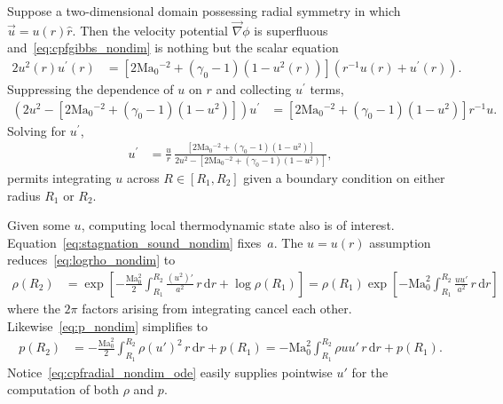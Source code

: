 \documentclass[letterpaper,11pt,nointlimits,reqno]{amsart}
\newcommand{\Mach}[1][]{\mbox{Ma}_{#1}}
\begin{document}
Suppose a two-dimensional domain possessing radial symmetry in which
$\vec{u}={u}\!\left(r\right)\hat{r}$.  Then the velocity potential
$\vec{\nabla}\phi$ is superfluous and~\eqref{eq:cpfgibbs_nondim} is nothing but
the scalar equation
\begin{align}
       2 u^2\!\left(r\right) u^\prime\!\left(r\right)
    &=
       \left[
          2 \Mach[0]{}^{-2}
        + \left(\gamma_0-1\right) \left(1 - u^2\!\left(r\right)\right)
       \right]
       \left(
          r^{-1} u\!\left(r\right) + u^\prime\!\left(r\right)
       \right)
.
\end{align}
Suppressing the dependence of $u$ on $r$ and collecting $u^\prime$ terms,
\begin{align}
       \left(
           2 u^2
         - \left[
              2 \Mach[0]{}^{-2} + \left(\gamma_0-1\right) \left(1 - u^2\right)
           \right]
       \right)
       u^\prime
    &=
       \left[
          2 \Mach[0]{}^{-2} + \left(\gamma_0-1\right) \left(1 - u^2\right)
       \right]
       r^{-1} u
.
\end{align}
Solving for $u^\prime$,
\begin{align}
       u^\prime
    &=
       \frac{u}{r}
       \,
       \frac{
         \left[
            2 \Mach[0]{}^{-2} + \left(\gamma_0-1\right) \left(1 - u^2\right)
         \right]
       }{
           2 u^2
         - \left[
              2 \Mach[0]{}^{-2} + \left(\gamma_0-1\right) \left(1 - u^2\right)
           \right]
       }
\label{eq:cpfradial_nondim_ode}
,
\end{align}
permits integrating $u$ across $R\in\left[R_1, R_2\right]$ given a
boundary condition on either radius $R_1$ or $R_2$.

Given some $u$, computing local thermodynamic state also is of interest.
Equation~\eqref{eq:stagnation_sound_nondim} fixes~$a$.  The
$u=u\!\left(r\right)$ assumption reduces~\eqref{eq:logrho_nondim} to
\begin{align}
  \rho\!\left(R_2\right)
  &=
  \exp\left[
    - \frac{\Mach[0]^2}{2} \int_{R_1}^{R_2}
        \frac{\left(u^2\right)'}{a^2}
      \, r \, \mathrm{d}r
    + \log\rho\!\left(R_1\right)
  \right]
   =
  \rho\!\left(R_1\right) \exp\left[
    - \Mach[0]^2 \int_{R_1}^{R_2}
        \frac{u u'}{a^2}
      \, r \, \mathrm{d}r
  \right]
\label{eq:cpfradial_nondim_rho}
\end{align}
where the $2\pi$ factors arising from integrating cancel each other.
Likewise~\eqref{eq:p_nondim} simplifies to
\begin{align}
  p\!\left(R_2\right)
  &=
    - \frac{\Mach[0]^2}{2} \int_{R_1}^{R_2}
        \rho \left(u'\right)^2
      \, r \, \mathrm{d}r
    + p\!\left(R_1\right)
   =
    -\Mach[0]^2 \int_{R_1}^{R_2} \rho u u' \, r \, \mathrm{d}r
      + p\!\left(R_1\right)
\label{eq:cpfradial_nondim_p}
.
\end{align}
Notice~\eqref{eq:cpfradial_nondim_ode} easily supplies pointwise $u'$ for the
computation of both $\rho$ and $p$.
\end{document}
